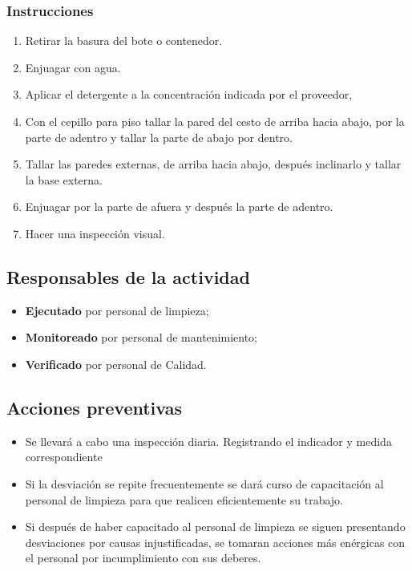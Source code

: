 \subsubsection{Instrucciones}

\begin{enumerate}
	\item Retirar la basura del bote o contenedor.
	\item Enjuagar con agua.
	\item Aplicar el detergente a la concentración indicada por el proveedor,
	\item Con el cepillo para piso tallar la pared del cesto de arriba hacia abajo, por la parte de adentro y tallar la parte de abajo por dentro.
	\item Tallar las paredes externas, de arriba hacia abajo, después inclinarlo y tallar la base externa.
	\item Enjuagar por la parte de afuera y después la parte de adentro.
	\item Hacer una inspección visual.
\end{enumerate}

\subsection{Responsables de la actividad}

\begin{itemize}
	\item \textbf{Ejecutado} por personal de limpieza;
	\item \textbf{Monitoreado} por personal de mantenimiento;
	\item \textbf{Verificado} por personal de Calidad.
\end{itemize}

\subsection{Acciones preventivas}

\begin{itemize}
	\item Se llevará a cabo una inspección diaria. Registrando el indicador y medida correspondiente
	\item Si la desviación se repite frecuentemente se dará curso de capacitación al personal de limpieza para que realicen eficientemente su trabajo.
	\item Si después de haber capacitado al personal de limpieza se siguen presentando desviaciones por causas injustificadas, se tomaran acciones más enérgicas con el personal por incumplimiento con sus deberes.
\end{itemize}

